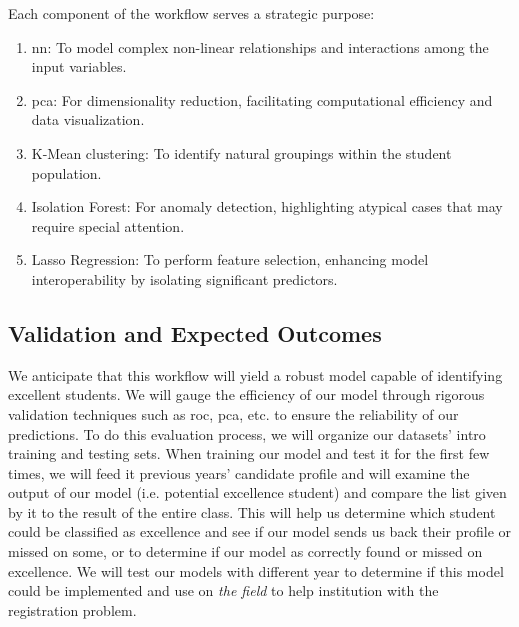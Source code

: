 \documentclass[../main.tex]{subfiles}
\begin{document}
Each component of the workflow serves a strategic purpose:

\begin{enumerate}
    \item \acrfull{nn}: To model complex non-linear relationships and interactions among the input variables.
    \item \acrfull{pca}: For dimensionality reduction, facilitating computational efficiency and data visualization.
    \item K-Mean clustering: To identify natural groupings within the student population.
    \item Isolation Forest: For anomaly detection, highlighting atypical cases that may require special attention.
    \item Lasso Regression: To perform feature selection, enhancing model interoperability by isolating significant predictors.
\end{enumerate}

\subsection{Validation and Expected Outcomes}
\label{subsec:concimp_validexcpecoutcomes}
 We anticipate that this workflow will yield a robust model capable of identifying excellent students. We will gauge the efficiency of our model through rigorous validation techniques such as \acrfull{roc}, \acrfull{pca}, etc. to ensure the reliability of our predictions. 
To do this evaluation process, we will organize our datasets' intro training and testing sets. When training our model and test it for the first few times, we will feed it previous years' candidate profile and will examine the output of our model (i.e. potential excellence student) and compare the list given by it to the result of the entire class. This will help us determine which student could be classified as excellence and see if our model sends us back their profile or missed on some, or  to determine if our model as correctly found or missed on excellence.  
We will test our models with different year to determine if this model could be implemented and use on \textit{the field} to help institution with the registration problem.
\end{document}
